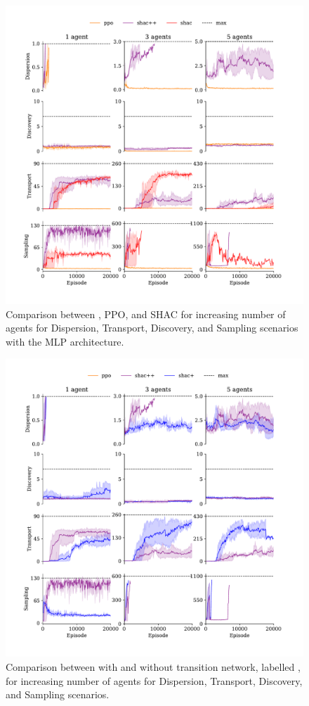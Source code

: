 \newpage
\appendix
\onecolumn

\begin{figure}[t]
    \centering
    \includegraphics[width=\columnwidth]{figs/main-mlp.pdf}
    \caption{Comparison between \fname{}, PPO, and SHAC for increasing number of agents for Dispersion, Transport, Discovery, and Sampling scenarios with the MLP architecture.}
    \label{apx:fig:experiments-mlp}
\end{figure}

\begin{figure}[!t]
    \centering
    \includegraphics[width=\columnwidth]{figs/ablation-mlp.pdf}
    \caption{Comparison between \fname{} with and without transition network, labelled \fnamer{}, for increasing number of agents for Dispersion, Transport, Discovery, and Sampling scenarios.}
    \label{fig:ablation}
\end{figure}

